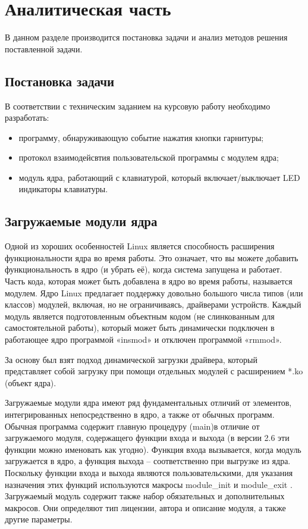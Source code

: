 \section{Аналитическая часть}
В данном разделе производится постановка задачи и анализ методов решения поставленной задачи.
\subsection{Постановка задачи}

В соответствии с техническим заданием на курсовую работу необходимо разработать:
\begin{itemize}
    \item программу, обнаруживающую событие нажатия кнопки гарнитуры;
    \item протокол взаимодейсвтия пользовательской программы с модулем ядра;
    \item модуль ядра, работающий с клавиатурой, который включает/выключает LED индикаторы клавиатуры.
\end{itemize}
\subsection{Загружаемые модули ядра}
Одной из хороших особенностей Linux является способность расширения функциональности ядра во время работы. Это означает, что вы можете добавить функциональность в ядро (и убрать её), когда система запущена и работает. Часть кода, которая может быть добавлена в ядро во время работы, называется модулем. Ядро Linux предлагает поддержку довольно большого числа типов (или классов) модулей, включая, но не ограничиваясь, драйверами устройств. Каждый модуль является подготовленным объектным кодом (не слинкованным для самостоятельной работы), который может быть динамически подключен в работающее ядро программой «insmod» и отключен программой «rmmod».

За основу был взят подход динамической загрузки драйвера, который представляет собой загрузку при помощи отдельных модулей с расширением *.ko (объект ядра).

Загружаемые модули ядра имеют ряд фундаментальных отличий от элементов, интегрированных непосредственно в ядро, а также от обычных программ. Обычная программа содержит главную процедуру (main)в отличие от загружаемого модуля, содержащего функции входа и выхода (в версии 2.6 эти функции можно именовать как угодно). Функция входа вызывается, когда модуль загружается в ядро, а функция выхода – соответственно при выгрузке из ядра. Поскольку функции входа и выхода являются пользовательскими, для указания назначения этих функций используются макросы module\_init и module\_exit . Загружаемый модуль содержит также набор обязательных и дополнительных макросов. Они определяют тип лицензии, автора и описание модуля, а также другие параметры\cite{1}. 

